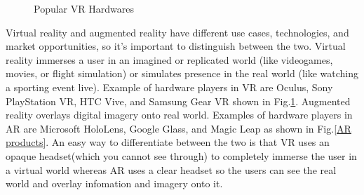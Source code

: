 \documentclass[preprint,12pt]{elsarticle}
\begin{document}
\begin{figure}[!hbp]
	\centering
	\caption{Popular VR Hardwares}
	\label{VR products}
\end{figure}

Virtual reality and augmented reality have different use cases, technologies, and market opportunities, so it's important to distinguish between the two. Virtual reality immerses a user in an imagined or replicated world (like videogames, movies, or flight simulation) or simulates presence in the real world (like watching a sporting event live). Example of hardware players in VR are Oculus, Sony PlayStation VR, HTC Vive, and Samsung Gear VR shown in Fig.\ref{VR products}. Augmented reality overlays digital imagery onto real world. Examples of hardware players in AR are Microsoft HoloLens, Google Glass, and Magic Leap as shown in Fig.\ref{AR products}. An easy way to differentiate between the two is that VR uses an opaque headset(which you cannot see through) to completely immerse the user in a virtual world whereas AR uses a clear headset so the users can see the real world and overlay infomation and imagery onto it.
\end{document}
